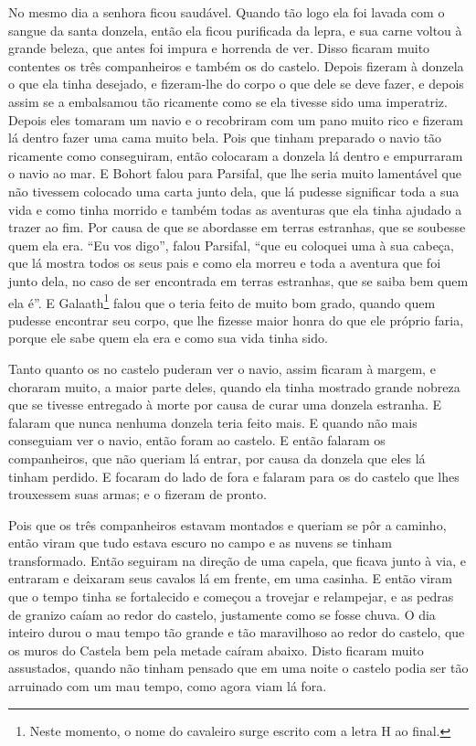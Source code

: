 No mesmo dia a senhora ficou saudável. Quando tão logo ela foi lavada com o
sangue da santa donzela, então ela ficou purificada da lepra, e sua carne
voltou à grande beleza, que antes foi impura e horrenda de ver. Disso ficaram
muito contentes os três companheiros e também os do castelo. Depois fizeram à
donzela o que ela tinha desejado, e fizeram-lhe do corpo o que dele se deve
fazer, e depois assim se a embalsamou tão ricamente como se ela tivesse sido
uma imperatriz. Depois eles tomaram um navio e o recobriram com um pano muito
rico e fizeram lá dentro fazer uma cama muito bela. Pois que tinham preparado o
navio tão ricamente como conseguiram, então colocaram a donzela lá dentro e
empurraram o navio ao mar. E Bohort falou para Parsifal, que lhe seria muito
lamentável que não tivessem colocado uma carta junto dela, que lá pudesse
significar toda a sua vida e como tinha morrido e também todas as aventuras que
ela tinha ajudado a trazer ao fim. Por causa de que se abordasse em terras
estranhas, que se soubesse quem ela era. “Eu vos digo”, falou Parsifal, “que
eu coloquei uma à sua cabeça, que lá mostra todos os seus pais e como ela
morreu e toda a aventura que foi junto dela, no caso de ser encontrada em
terras estranhas, que se saiba bem quem ela é”. E Galaath\footnote{ Neste
momento, o nome do cavaleiro surge escrito com a letra H ao final. 
} falou que o teria feito de muito bom grado, quando quem pudesse encontrar seu
corpo, que lhe fizesse maior honra do que ele próprio faria, porque ele sabe
quem ela era e como sua vida tinha sido.

Tanto quanto os no castelo puderam ver o navio, assim ficaram à margem, e
choraram muito, a maior parte deles, quando ela tinha mostrado grande nobreza
que se tivesse entregado à morte por causa de curar uma donzela estranha. E
falaram que nunca nenhuma donzela teria feito mais. E quando não mais
conseguiam ver o navio, então foram ao castelo. E então falaram os
companheiros, que não queriam lá entrar, por causa da donzela que eles lá
tinham perdido. E focaram do lado de fora e falaram para os do castelo que lhes
trouxessem suas armas; e o fizeram de pronto. 

Pois que os três companheiros estavam montados e queriam se pôr a caminho, então
viram que tudo estava escuro no campo e as nuvens se tinham transformado. Então
seguiram na direção de uma capela, que ficava junto à via, e entraram e
deixaram seus cavalos lá em frente, em uma casinha. E então viram que o tempo
tinha se fortalecido e começou a trovejar e relampejar, e as pedras de granizo
caíam ao redor do castelo, justamente como se fosse chuva. O dia inteiro durou
o mau tempo tão grande e tão maravilhoso ao redor do castelo, que os muros do
Castela bem pela metade caíram abaixo. Disto ficaram muito assustados, quando
não tinham pensado que em uma noite o castelo podia ser tão arruinado com um
mau tempo, como agora viam lá fora.

